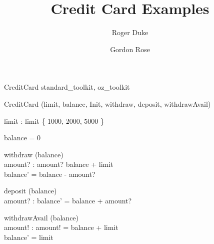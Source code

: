 \documentclass[12pt]{article}
\begin{document}
\title{Credit Card Examples}
\author{Roger Duke \and Gordon Rose}
\date{}
\maketitle

\begin{zsection}
  \SECTION CreditCard \parents standard\_toolkit, oz\_toolkit
\end{zsection}

\begin{class}{CreditCard} 
\also
        \project (limit, balance, Init, withdraw, deposit, withdrawAvail) \\
        \begin{axdef}
		limit : \nat
	\where
		limit \in \{ 1000, 2000, 5000 \}
	\end{axdef}\classbreak
	 \classbreak
	\begin{init}
		balance = 0
	\end{init} \classbreak
	\begin{op}{withdraw}
		\Delta (balance) \\
		amount? : \nat
	\where
		amount? \leq balance + limit \\
		balance' = balance - amount?
	\end{op} \classbreak
	\begin{op}{deposit}
		\Delta (balance) \\
		amount? : \nat
	\where
		balance' = balance + amount?
	\end{op} \classbreak
	\begin{op}{withdrawAvail}
		\Delta (balance) \\
		amount! : \nat
	\where
		amount! = balance + limit \\
		balance' = \negate limit
	\end{op}	
\end{class}
\end{document}
